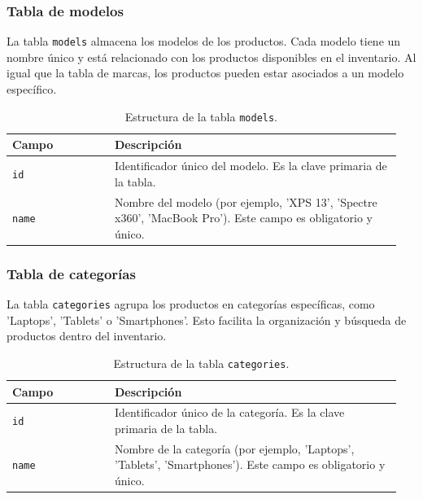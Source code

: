 \subsubsection*{Tabla de modelos}

La tabla \texttt{models} almacena los modelos de los productos. Cada modelo tiene un nombre único y está relacionado con los productos disponibles en el inventario. Al igual que la tabla de marcas, los productos pueden estar asociados a un modelo específico.

\begin{table}[H]
	\centering
	\begin{tabular}{|p{0.25\linewidth}|p{0.7\linewidth}|}
		\hline
		\textbf{Campo} & \textbf{Descripción} \\
		\hline
		\texttt{id} & Identificador único del modelo. Es la clave primaria de la tabla. \\
		\hline
		\texttt{name} & Nombre del modelo (por ejemplo, 'XPS 13', 'Spectre x360', 'MacBook Pro'). Este campo es obligatorio y único. \\
		\hline
	\end{tabular}
	\caption{Estructura de la tabla \texttt{models}.}
	\label{tab:tabla_models}
\end{table}

\subsubsection*{Tabla de categorías}

La tabla \texttt{categories} agrupa los productos en categorías específicas, como 'Laptops', 'Tablets' o 'Smartphones'. Esto facilita la organización y búsqueda de productos dentro del inventario.

\begin{table}[H]
	\centering
	\begin{tabular}{|p{0.25\linewidth}|p{0.7\linewidth}|}
		\hline
		\textbf{Campo} & \textbf{Descripción} \\
		\hline
		\texttt{id} & Identificador único de la categoría. Es la clave primaria de la tabla. \\
		\hline
		\texttt{name} & Nombre de la categoría (por ejemplo, 'Laptops', 'Tablets', 'Smartphones'). Este campo es obligatorio y único. \\
		\hline
	\end{tabular}
	\caption{Estructura de la tabla \texttt{categories}.}
	\label{tab:tabla_categories}
\end{table}

